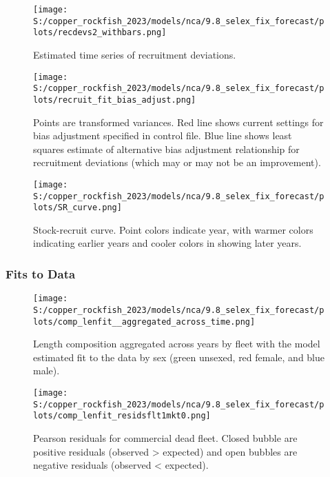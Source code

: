 \documentclass[11pt,
  english,
  letterpaper,
]{article}
\begin{document}
\pagebreak

\begin{figure}
\centering
\texttt{[image: S:/copper\_rockfish\_2023/models/nca/9.8\_selex\_fix\_forecast/plots/recdevs2\_withbars.png]}
\caption{Estimated time series of recruitment deviations.\label{fig:rec-devs}}
\end{figure}

\pagebreak

\begin{figure}
\centering
\texttt{[image: S:/copper\_rockfish\_2023/models/nca/9.8\_selex\_fix\_forecast/plots/recruit\_fit\_bias\_adjust.png]}
\caption{Points are transformed variances. Red line shows current settings for bias adjustment specified in control file. Blue line shows least squares estimate of alternative bias adjustment relationship for recruitment deviations (which may or may not be an improvement).\label{fig:bias-adjust}}
\end{figure}

\newpage

\begin{figure}
\centering
\texttt{[image: S:/copper\_rockfish\_2023/models/nca/9.8\_selex\_fix\_forecast/plots/SR\_curve.png]}
\caption{Stock-recruit curve. Point colors indicate year, with warmer colors indicating earlier years and cooler colors in showing later years.\label{fig:bh-curve}}
\end{figure}

\pagebreak

\hypertarget{fits-to-data}{%
\subsubsection{Fits to Data}\label{fits-to-data}}

\begin{figure}
\centering
\texttt{[image: S:/copper\_rockfish\_2023/models/nca/9.8\_selex\_fix\_forecast/plots/comp\_lenfit\_\_aggregated\_across\_time.png]}
\caption{Length composition aggregated across years by fleet with the model estimated fit to the data by sex (green unsexed, red female, and blue male).\label{fig:len-agg-fit}}
\end{figure}

\pagebreak

\begin{figure}
\centering
\texttt{[image: S:/copper\_rockfish\_2023/models/nca/9.8\_selex\_fix\_forecast/plots/comp\_lenfit\_residsflt1mkt0.png]}
\caption{Pearson residuals for commercial dead fleet. Closed bubble are positive residuals (observed \textgreater{} expected) and open bubbles are negative residuals (observed \textless{} expected).\label{fig:com-dead-pearson}}
\end{figure}
\end{document}
